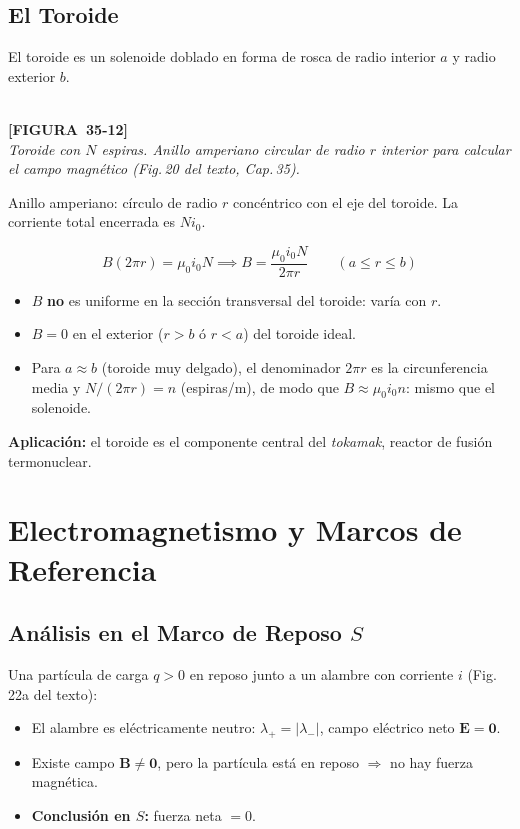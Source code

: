 \documentclass[12pt, letterpaper]{report}
\numberwithin{equation}{section}
\newcommand{\vB}[1]{\boldsymbol{#1}}          %
\newcommand{\figplaceholder}[2]{%
  \begin{tcolorbox}[figbox]
    \centering
    \textcolor{NavyBlue!50}{\rule{0pt}{2.8cm}}\\[4pt]
    {\small\color{NavyBlue}\textbf{[FIGURA\ #1]}\\[2pt]
    \textit{#2}}
  \end{tcolorbox}
}
\begin{document}
\subsection{El Toroide}

El toroide es un solenoide doblado en forma de rosca de radio interior
$a$ y radio exterior $b$.

\figplaceholder{35-12}{Toroide con $N$ espiras. Anillo amperiano circular de radio
$r$ interior para calcular el campo magnético
(Fig.\,20 del texto, Cap.\,35).}

Anillo amperiano: círculo de radio $r$ concéntrico con el eje del toroide.
La corriente total encerrada es $Ni_0$.

\begin{equation}
  B(2\pi r) = \mu_0 i_0 N \implies
  \boxed{B = \frac{\mu_0 i_0 N}{2\pi r}} \qquad (a\le r\le b)
  \label{eq:Btoroide}
\end{equation}

\begin{itemize}[leftmargin=1.8em, itemsep=2pt]
  \item $B$ \textbf{no} es uniforme en la sección transversal del toroide:
        varía con $r$.
  \item $B=0$ en el exterior ($r>b$ ó $r<a$) del toroide ideal.
  \item Para $a\approx b$ (toroide muy delgado), el denominador $2\pi r$
        es la circunferencia media y $N/(2\pi r)=n$ (espiras/m), de modo
        que $B\approx\mu_0 i_0 n$: mismo que el solenoide.
\end{itemize}

\textbf{Aplicación:} el toroide es el componente central del
\textit{tokamak}, reactor de fusión termonuclear.

\section{Electromagnetismo y Marcos de Referencia}

\subsection{Análisis en el Marco de Reposo $S$}

Una partícula de carga $q>0$ en reposo junto a un alambre con corriente $i$
(Fig.\,22a del texto):

\begin{itemize}[leftmargin=1.8em, itemsep=2pt]
  \item El alambre es eléctricamente neutro: $\lambda_+=|\lambda_-|$,
        campo eléctrico neto $\vB{E}=\vB{0}$.
  \item Existe campo $\vB{B}\ne\vB{0}$, pero la partícula está en reposo
        $\Rightarrow$ no hay fuerza magnética.
  \item \textbf{Conclusión en $S$:} fuerza neta $= 0$.
\end{itemize}
\end{document}
